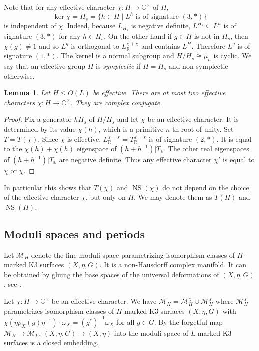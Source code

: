\documentclass[a4paper]{amsart}
\theoremstyle{definition}
\theoremstyle{plain}
\newtheorem{lemma}[definition]{Lemma}
\DeclareMathOperator{\NS}{NS}
\newcommand{\RR}{\mathbb{R}}
\newcommand{\CC}{\mathbb{C}}
\newcommand{\M}{\mathcal{M}}
\begin{document}
Note that for any effective character $\chi\colon H \to \CC^\times$ of $H$,
\[\ker \chi = H_s = \{h \in H \mid L^h \mbox{ is of signature } (3,*)\}\]
is independent of $\chi$. Indeed, because $L_{H_s}$ is negative definite, $L^{H_s}\subseteq L^h$ is of signature $(3,*)$ for any $h \in H_s$. On the other hand if $g\in H$ is not in $H_s$, then $\chi(g)\neq 1$ and so $L^g$ is orthogonal to $L_\RR^{\chi+\bar \chi}$ and contains $L^H$. Therefore $L^g$ is of signature $(1,*)$.
The kernel is a normal subgroup and $H/H_s \cong \mu_n$ is cyclic. We say that an effective group $H$ is \emph{symplectic} if $H=H_s$ and non-symplectic otherwise.

\begin{lemma}
 Let $H \leq O(L)$ be effective. There are at most two effective characters $\chi \colon H \to \CC^\times$. They are complex conjugate.
\end{lemma}
\begin{proof}
  Fix a generator $h H_s$ of $H/H_s$ and let $\chi$ be an effective character. It is determined by its value $\chi(h)$, which is a primitive $n$-th root of unity. Set $T=T(\chi)$.
Since $\chi$ is effective,
$L_\RR^{\chi +\bar \chi}= T_\RR^{\chi +\bar \chi}$ is of signature $(2,*)$.
It is equal to the $\chi(h)+\bar \chi(h)$ eigenspace of $(h+h^{-1})|T_\RR$. The other real eigenspaces of $(h+h^{-1})|T_\RR$ are negative definite. Thus any effective character $\chi'$ is equal to $\chi$ or $\bar \chi$.
\end{proof}
In particular this shows that $T(\chi)$ and $\NS(\chi)$ do not depend on the choice of the effective character $\chi$, but only on $H$. We may denote them as $T(H)$ and $\NS(H)$.
\subsection{Moduli spaces and periods}
Let $\M_H$ denote the fine moduli space parametrizing isomorphism classes of $H$-marked K3 surfaces $(X,\eta,G)$. It is a non-Hausdorff complex manifold.
It can be obtained by gluing the base spaces of the universal deformations of $(X,\eta,G)$, see \cite[\S 3]{brandhorst-cattaneo}.

Let $\chi\colon H \to \CC^\times$ be an effective character. We have $\M_H = \M^\chi_H \cup \M^{\bar\chi}_H$ where $\M_H^\chi$ parametrizes isomorphism classes of $H$-marked K3 surfaces $(X,\eta, G)$ with $\chi(\eta \rho_X(g)\eta^{-1}) \cdot \omega_X = (g^*)^{-1} \omega_X$ for all $g \in G$.
By \cite[Prop. 3.9]{brandhorst-cattaneo} the forgetful map $\M_H \to \M_L$, $(X,\eta,G) \mapsto (X,\eta)$ into the moduli space of $L$-marked K3 surfaces is a closed embedding.
\end{document}
